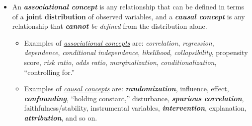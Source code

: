 \documentclass[11pt]{article}
\begin{document}
\begin{itemize}
\item An \emph{\textbf{associational concept}} is any relationship that can be defined in terms of a \textbf{joint distribution} of observed variables, and a \emph{\textbf{causal concept}} is any relationship that \emph{\textbf{cannot} be defined} from the distribution alone.
\begin{itemize}
\item Examples of \underline{\emph{associational concepts}} are: \emph{correlation}, \emph{regression}, \emph{dependence}, \emph{conditional independence}, \emph{likelihood}, \emph{collapsibility}, propensity score, \emph{risk ratio}, \emph{odds ratio}, \emph{marginalization}, \emph{conditionalization}, “controlling for.”
\item Examples of \underline{\emph{causal concepts}} are: \emph{\textbf{randomization}}, influence, effect, \emph{\textbf{confounding}}, “holding constant,” disturbance,
\emph{\textbf{spurious correlation}}, faithfulness/stability, instrumental variables, \emph{\textbf{intervention}}, explanation, \emph{\textbf{attribution}}, and so on.
\end{itemize}
\end{itemize}
\end{document}
